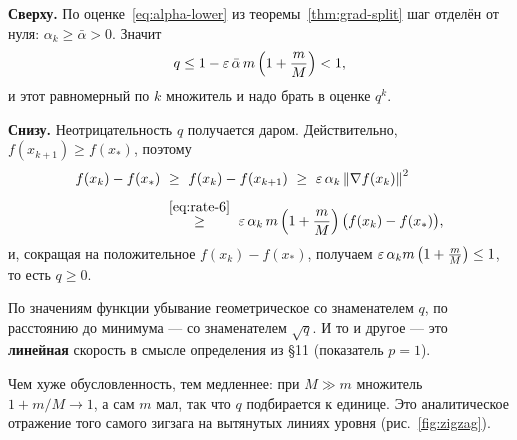 \begin{idea}[title={Почему $q$ действительно лежит в $(0,1)$}]
\textbf{Сверху.} По оценке~\eqref{eq:alpha-lower} из
теоремы~\ref{thm:grad-split} шаг отделён от нуля: $\alpha_k \ge \bar\alpha > 0$.
Значит
\[
  q \le 1 - \varepsilon\,\bar\alpha\, m\left(1 + \frac{m}{M}\right) < 1 ,
\]
и этот равномерный по $k$ множитель и надо брать в оценке $q^k$.

\medskip
\textbf{Снизу.} Неотрицательность $q$ получается даром. Действительно,
$f(x_{k+1}) \ge f(x_*)$, поэтому
\[
  \begin{aligned}
    f(x_k) - f(x_*)
      &\ \ge\ f(x_k) - f(x_{k+1})
       \ \ge\ \varepsilon\,\alpha_k \left\lVert \nabla f(x_k) \right\rVert^2 \\[4pt]
      &\ \overset{\eqref{eq:rate-6}}{\ge}\
       \varepsilon\,\alpha_k\, m\left(1+\frac{m}{M}\right)\big(f(x_k) - f(x_*)\big) ,
  \end{aligned}
\]
и, сокращая на положительное $f(x_k) - f(x_*)$, получаем
$\varepsilon\,\alpha_k m\left(1+\frac{m}{M}\right) \le 1$, то есть $q \ge 0$.
\end{idea}

\begin{idea}[title={Что это за скорость}]
По значениям функции убывание геометрическое со знаменателем $q$, по
расстоянию до минимума — со знаменателем $\sqrt q$. И то и другое — это
\textbf{линейная} скорость в смысле определения из \S11 (показатель $p=1$).

\medskip
Чем хуже обусловленность, тем медленнее: при $M \gg m$ множитель
$1 + m/M \to 1$, а сам $m$ мал, так что $q$ подбирается к единице. Это
аналитическое отражение того самого зигзага на вытянутых линиях уровня
(рис.~\ref{fig:zigzag}).
\end{idea}
